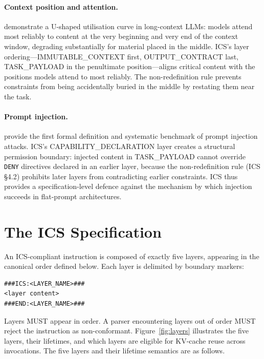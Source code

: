 \documentclass[11pt]{article}
\begin{document}
\paragraph{Context position and attention.}
\citet{liu2024lost} demonstrate a U-shaped utilisation curve in long-context
LLMs: models attend most reliably to content at the very beginning and very end
of the context window, degrading substantially for material placed in the
middle. ICS's layer ordering---IMMUTABLE\_CONTEXT first, OUTPUT\_CONTRACT
last, TASK\_PAYLOAD in the penultimate position---aligns critical content with
the positions models attend to most reliably. The non-redefinition rule
prevents constraints from being accidentally buried in the middle by restating
them near the task.

\paragraph{Prompt injection.}
\citet{liu2024injection} provide the first formal definition and systematic
benchmark of prompt injection attacks. ICS's CAPABILITY\_DECLARATION layer
creates a structural permission boundary: injected content in TASK\_PAYLOAD
cannot override \texttt{DENY} directives declared in an earlier layer, because
the non-redefinition rule (ICS \S4.2) prohibits later layers from contradicting
earlier constraints. ICS thus provides a specification-level defence against the
mechanism by which injection succeeds in flat-prompt architectures.

\section{The ICS Specification}
\label{sec:spec}

An ICS-compliant instruction is composed of exactly five layers, appearing
in the canonical order defined below. Each layer is delimited by boundary
markers:

\begin{lstlisting}
###ICS:<LAYER_NAME>###
<layer content>
###END:<LAYER_NAME>###
\end{lstlisting}

Layers MUST appear in order. A parser encountering layers out of order MUST
reject the instruction as non-conformant. Figure~\ref{fig:layers} illustrates
the five layers, their lifetimes, and which layers are eligible for
KV-cache reuse across invocations. The five layers and their lifetime
semantics are as follows.
\end{document}

